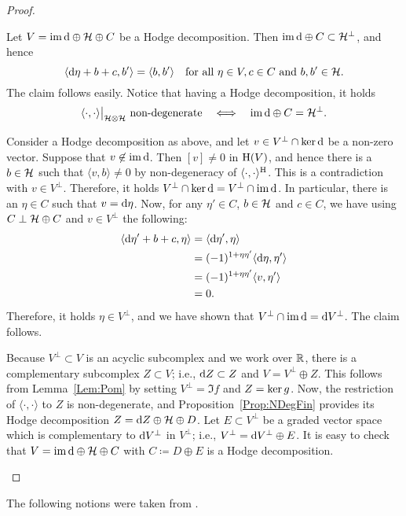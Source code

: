 \documentclass[\MainFolder/Text.tex]{subfiles}
\begin{document}
\begin{proof}
\begin{ProofList}
\item Let $V = \operatorname{im} \mathrm{d} \oplus \mathcal{H} \oplus C$ be a Hodge decomposition. Then $\operatorname{im} \mathrm{d} \oplus C \subset \mathcal{H}^\perp$, and hence
$$ \langle \mathrm{d} \eta + b + c, b' \rangle = \langle b,b'\rangle\quad\text{for all }\eta\in V, c\in C\text{ and }b, b'\in \mathcal{H}. $$
The claim follows easily. Notice that having a Hodge decomposition, it holds
$$ \Restr{\langle \cdot,\cdot\rangle}{\Harm\otimes \Harm}\text{ non-degenerate}\quad\Equiv\quad \Im\Dd \oplus C=\Harm^\perp. $$ 
\item Consider a Hodge decomposition as above, and let $v\in V^\perp \cap \operatorname{ker} \mathrm{d}$ be a non-zero vector. Suppose that $v\not\in \operatorname{im}\mathrm{d}$. Then $[v] \neq 0$ in $\mathrm{H}(V)$, and hence there is a $b\in \mathcal{H}$ such that $\langle v,b \rangle \neq 0$ by non-degeneracy of $\langle\cdot,\cdot\rangle^{\mathrm{H}}$. This is a contradiction with $v\in V^\perp$. Therefore, it holds $V^\perp \cap \operatorname{ker} \mathrm{d} = V^\perp \cap \operatorname{im} \mathrm{d}$. In particular, there is an $\eta \in C$ such that $v = \mathrm{d} \eta$. Now, for any $\eta'\in C$, $b\in \mathcal{H}$ and $c\in C$, we have using $C\perp \mathcal{H}\oplus C$ and $v\in V^\perp$ the following:
\begin{align*}
\langle \mathrm{d} \eta' + b + c, \eta \rangle &= \langle \mathrm{d} \eta',\eta \rangle \\
&=(-1)^{1+\eta\eta'}\langle\mathrm{d}\eta,\eta'\rangle\\
&= (-1)^{1+\eta\eta'}\langle v,\eta'\rangle\\
&= 0.
\end{align*}
Therefore, it holds $\eta\in V^\perp$, and we have shown that $V^\perp \cap \operatorname{im}\mathrm{d} = \mathrm{d} V^\perp$. The claim follows.
\item Because $V^\perp \subset V$ is an acyclic subcomplex and we work over $\mathbb{R}$, there is a complementary subcomplex $Z\subset V$; i.e., $\mathrm{d} Z\subset Z$ and $V = V^\perp\oplus Z$. This follows from Lemma~\ref{Lem:Pom} by setting $V^\perp = \Im f$ and $Z=\operatorname{ker} g$. Now, the restriction of $\langle\cdot,\cdot\rangle$ to $Z$ is non-degenerate, and Proposition~\ref{Prop:NDegFin} provides its Hodge decomposition $Z=\mathrm{d} Z \oplus \mathcal{H} \oplus D$. Let $E\subset V^\perp$ be a graded vector space which is complementary to $\mathrm{d} V^\perp$ in $V^\perp$; i.e., $V^\perp = \mathrm{d} V^\perp \oplus E$. It is easy to check that $V=\operatorname{im}\mathrm{d}\oplus\mathcal{H}\oplus C$ with $C\coloneqq D \oplus E$ is a Hodge decomposition.
\qedhere
\end{ProofList}
\end{proof}
The following notions were taken from \cite{Van2019}.
\end{document}
